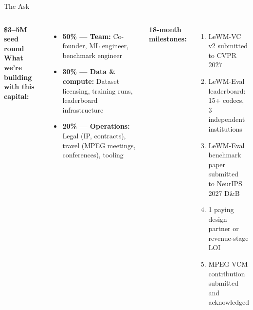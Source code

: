 \documentclass[aspectratio=169, professionalfonts, 10pt]{beamer}
\begin{document}
\begin{frame}{The Ask}

  \begin{columns}[t]
    \textbf{\$3--5M seed round} \\
    \medskip
    \textbf{What we're building with this capital:} \\
    \begin{itemize}
      \item \textbf{50\% --- Team:} Co-founder, ML engineer, benchmark engineer \\
      \item \textbf{30\% --- Data \& compute:} Dataset licensing, training runs,
            leaderboard infrastructure \\
      \item \textbf{20\% --- Operations:} Legal (IP, contracts), travel
            (MPEG meetings, conferences), tooling \\
    \end{itemize}

    \textbf{18-month milestones:} \\
    \begin{enumerate}
      \item LeWM-VC v2 submitted to CVPR 2027 \\
      \item LeWM-Eval leaderboard: 15+ codecs, \\
            3 independent institutions \\
      \item LeWM-Eval benchmark paper submitted \\
            to NeurIPS 2027 D\&B \\
      \item 1 paying design partner or revenue-stage LOI \\
      \item MPEG VCM contribution submitted \\
            and acknowledged
    \end{enumerate}
  \end{columns}
\end{frame}
\end{document}
